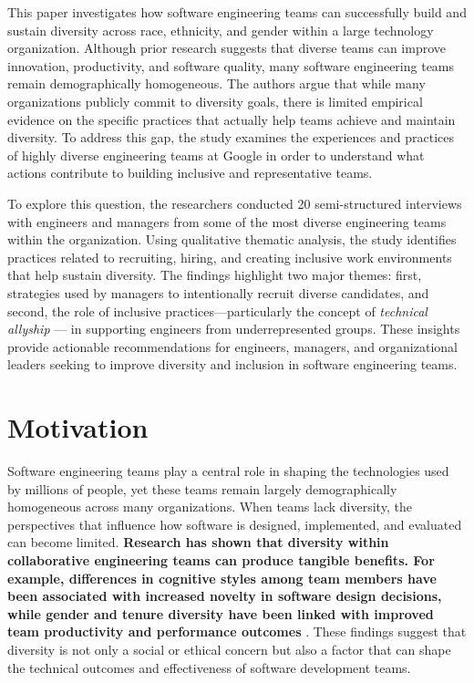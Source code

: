 This paper investigates how software engineering teams can successfully build and sustain diversity across race, ethnicity, and gender within a large technology organization. Although prior research suggests that diverse teams can improve innovation, productivity, and software quality, many software engineering teams remain demographically homogeneous. The authors argue that while many organizations publicly commit to diversity goals, there is limited empirical evidence on the specific practices that actually help teams achieve and maintain diversity. To address this gap, the study examines the experiences and practices of highly diverse engineering teams at Google in order to understand what actions contribute to building inclusive and representative teams.

To explore this question, the researchers conducted 20 semi-structured interviews with engineers and managers from some of the most diverse engineering teams within the organization. Using qualitative thematic analysis, the study identifies practices related to recruiting, hiring, and creating inclusive work environments that help sustain diversity. The findings highlight two major themes: first, strategies used by managers to intentionally recruit diverse candidates, and second, the role of inclusive practices—particularly the concept of \textit{technical allyship} — in supporting engineers from underrepresented groups. These insights provide actionable recommendations for engineers, managers, and organizational leaders seeking to improve diversity and inclusion in software engineering teams.

\section{Motivation}
Software engineering teams play a central role in shaping the technologies used by millions of people, yet these teams remain largely demographically homogeneous across many organizations. When teams lack diversity, the perspectives that influence how software is designed, implemented, and evaluated can become limited. \textbf{Research has shown that diversity within collaborative engineering teams can produce tangible benefits. For example, differences in cognitive styles among team members have been associated with increased novelty in software design decisions, while gender and tenure diversity have been linked with improved team productivity and performance outcomes} \cite{pretorius2020intuition,vasilescu2015gender}. These findings suggest that diversity is not only a social or ethical concern but also a factor that can shape the technical outcomes and effectiveness of software development teams.

